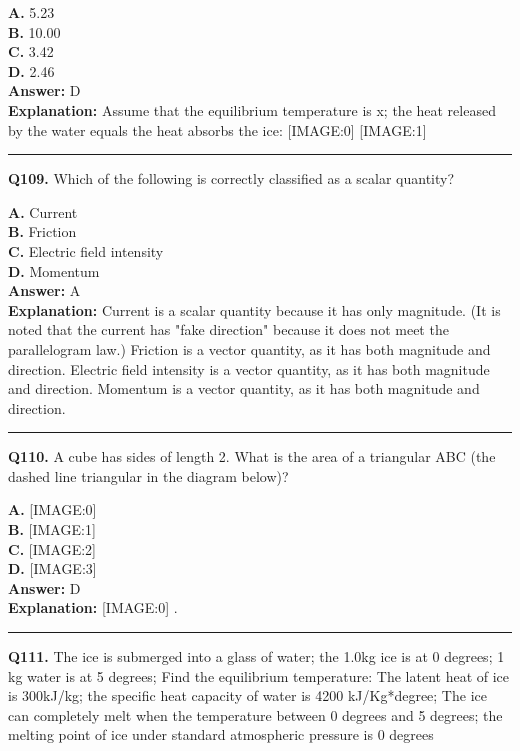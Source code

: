 \documentclass[12pt]{article}
\begin{document}
\textbf{A.} 5.23 \\
\textbf{B.} 10.00 \\
\textbf{C.} 3.42 \\
\textbf{D.} 2.46 \\

\textbf{Answer:} D \\
\textbf{Explanation:} Assume that the equilibrium temperature is x; the heat released by the water equals the heat absorbs the ice:
[IMAGE:0]
[IMAGE:1]

\hrule
\vspace{1em}


\noindent
\textbf{Q109.} Which of the following is correctly classified as a scalar quantity?



\textbf{A.} Current \\
\textbf{B.} Friction \\
\textbf{C.} Electric field intensity \\
\textbf{D.} Momentum \\

\textbf{Answer:} A \\
\textbf{Explanation:} Current is a scalar quantity because it has only magnitude. (It is noted that the current has "fake direction" because it does not meet the parallelogram law.)
Friction is a vector quantity, as it has both magnitude and direction.
Electric field intensity is a vector quantity, as it has both magnitude and direction.
Momentum is a vector quantity, as it has both magnitude and direction.

\hrule
\vspace{1em}


\noindent
\textbf{Q110.} A cube has sides of length 2. What is the area of a triangular ABC (the dashed line triangular in the diagram below)?



\textbf{A.} [IMAGE:0] \\
\textbf{B.} [IMAGE:1] \\
\textbf{C.} [IMAGE:2] \\
\textbf{D.} [IMAGE:3] \\

\textbf{Answer:} D \\
\textbf{Explanation:} [IMAGE:0]
.

\hrule
\vspace{1em}


\noindent
\textbf{Q111.} The ice is submerged into a glass of water; the 1.0kg ice is at 0 degrees; 1 kg water is at 5 degrees; Find the equilibrium temperature: The latent heat of ice is 300kJ/kg; the specific heat capacity of water is 4200 kJ/Kg*degree; The ice can completely melt when the temperature between 0 degrees and 5 degrees; the melting point of ice under standard atmospheric pressure is 0 degrees
\end{document}
